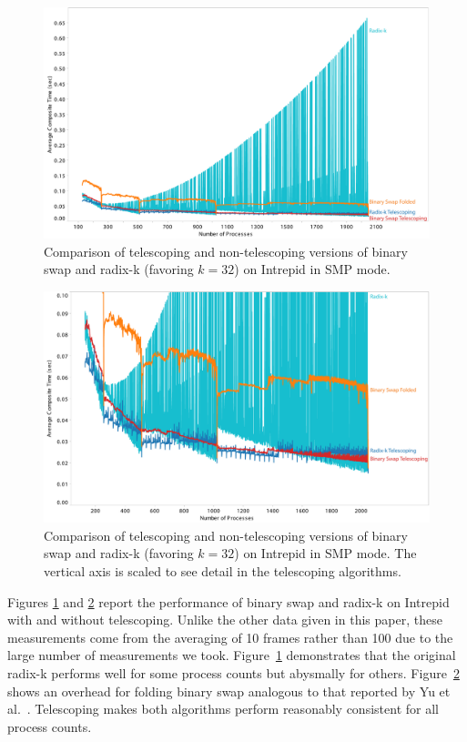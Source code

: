 \documentclass{acm_proc_article-sp}
\newcommand*{\scite}[1]{~\cite{#1}}
\newcommand{\etal}{et al.}
\begin{document}
\begin{figure}[tbp]
  \centering
  \includegraphics[width=\linewidth]{images/TelescopeCompositeIntrepidSMP}
  \caption{Comparison of telescoping and non-telescoping versions of binary
    swap and radix-k (favoring $k=32$) on Intrepid in SMP mode.}
  \label{fig:TelescopeCompositeIntrepidSMP}
\end{figure}

\begin{figure}[tbp]
  \centering
  \includegraphics[width=\linewidth]{images/TelescopeCompositeIntrepidSMPZoomed}
  \caption{Comparison of telescoping and non-telescoping versions of binary
    swap and radix-k (favoring $k=32$) on Intrepid in SMP mode.  The
    vertical axis is scaled to see detail in the telescoping algorithms.}
  \label{fig:TelescopeCompositeIntrepidSMPZoomed}
\end{figure}

Figures \ref{fig:TelescopeCompositeIntrepidSMP} and
\ref{fig:TelescopeCompositeIntrepidSMPZoomed} report the performance of
binary swap and radix-k on Intrepid with and without telescoping.  Unlike
the other data given in this paper, these measurements come from the
averaging of 10 frames rather than 100 due to the large number of
measurements we took.  Figure~\ref{fig:TelescopeCompositeIntrepidSMP}
demonstrates that the original radix-k performs well for some process
counts but abysmally for others.
Figure~\ref{fig:TelescopeCompositeIntrepidSMPZoomed} shows an overhead for
folding binary swap analogous to that reported by Yu \etal\scite{23Swap}.
Telescoping makes both algorithms perform reasonably consistent for all
process counts.
\end{document}

